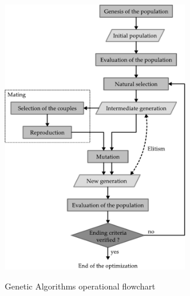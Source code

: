 \documentclass{ametsoc}
\begin{document}
\begin{figure}[t]
	\begin{center}
		\noindent\includegraphics[width=19pc,angle=0]{fig01.pdf}\\
	\end{center}
	\caption{Genetic Algorithms operational flowchart}
	\label{fig:structure_gas}
\end{figure}
\end{document}
